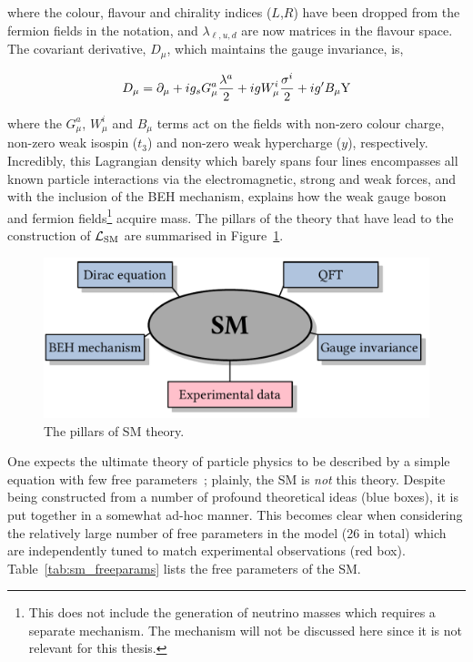 \noindent
where the colour, flavour and chirality indices ($L$,$R$) have been dropped from the fermion fields in the notation, and $\lambda_{\ell,u,d}$ are now matrices in the flavour space. The covariant derivative, $D_\mu$, which maintains the gauge invariance, is,

\begin{equation}
    D_\mu = \partial_\mu + i g_s G^a_\mu \frac{\lambda^a}{2} + i g W^i_\mu \frac{\sigma^i}{2} + i g' B_\mu {\rm{Y}}
\end{equation}

\noindent
where the $G^a_\mu$, $W^i_\mu$ and $B_\mu$ terms act on the fields with non-zero colour charge, non-zero weak isospin ($t_3$) and non-zero weak hypercharge ($y$), respectively. Incredibly, this Lagrangian density which barely spans four lines encompasses all known particle interactions via the electromagnetic, strong and weak forces, and with the inclusion of the BEH mechanism, explains how the weak gauge boson and fermion fields\footnote{This does not include the generation of neutrino masses which requires a separate mechanism. The mechanism will not be discussed here since it is not relevant for this thesis.} acquire mass. The pillars of the theory that have lead to the construction of $\mathcal{L}_{\rm{SM}}$ are summarised in Figure~\ref{fig:sm_pillars}.

\begin{figure}
  \centering
  \includegraphics[width=.7\linewidth]{Figures/theory/pillars_of_sm.pdf}
  \caption[The pillars of SM theory]
  {
    The pillars of SM theory.
  }
  \label{fig:sm_pillars}
\end{figure}

One expects the ultimate theory of particle physics to be described by a simple equation with few free parameters~\cite{Thomson:2013zua}; plainly, the SM is \textit{not} this theory. Despite being constructed from a number of profound theoretical ideas (blue boxes), it is put together in a somewhat ad-hoc manner. This becomes clear when considering the relatively large number of free parameters in the model (26 in total) which are independently tuned to match experimental observations (red box). Table~\ref{tab:sm_freeparams} lists the free parameters of the SM.


